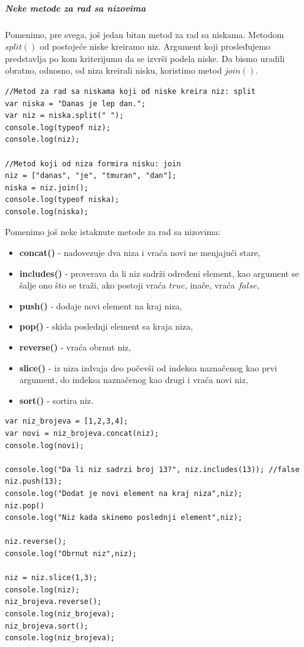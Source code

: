 \documentclass[a4paper]{article}
\begin{document}
\subparagraph{Neke metode za rad sa nizovima}

Pomenimo, pre svega, još jedan bitan metod za rad sa niskama. Metodom $split()$ od postojeće niske kreiramo niz. Argument koji prosleđujemo predstavlja po kom kriterijumu da se izvrši podela niske. Da bismo uradili obratno, odnosno, od niza kreirali nisku, koristimo metod $join()$.
\begin{lstlisting}[backgroundcolor = \color{lightgray}]
//Metod za rad sa niskama koji od niske kreira niz: split 
var niska = "Danas je lep dan.";
var niz = niska.split(" ");
console.log(typeof niz);
console.log(niz);

//Metod koji od niza formira nisku: join
niz = ["danas", "je", "tmuran", "dan"];
niska = niz.join();
console.log(typeof niska);
console.log(niska);
\end{lstlisting}
Pomenimo još neke istaknute metode za rad sa nizovima:  
\begin{itemize}
    \item \textbf{concat()} - nadovezuje dva niza i vraća novi ne menjajući stare,
    \item \textbf{includes()} - proverava da li niz sadrži određeni element, kao argument se šalje  ono što se traži, ako postoji vraća $true$, inače, vraća $false$,  
    \item \textbf{push()} - dodaje novi element na kraj niza, 
    \item \textbf{pop()} - skida poslednji element sa kraja niza, 
    \item \textbf{reverse()} - vraća obrnut niz, 
    \item \textbf{slice()} - iz niza izdvaja deo počevši od indeksa naznačenog kao prvi argument, do indeksa naznačenog kao drugi i vraća novi niz, 
    \item \textbf{sort()} - sortira niz.
\end{itemize}
\begin{lstlisting}[backgroundcolor = \color{lightgray}]
var niz_brojeva = [1,2,3,4];
var novi = niz_brojeva.concat(niz);
console.log(novi);

console.log("Da li niz sadrzi broj 13?", niz.includes(13)); //false
niz.push(13);
console.log("Dodat je novi element na kraj niza",niz);
niz.pop()
console.log("Niz kada skinemo poslednji element",niz);
			
niz.reverse();
console.log("Obrnut niz",niz);

niz = niz.slice(1,3);
console.log(niz);
niz_brojeva.reverse();
console.log(niz_brojeva);
niz_brojeva.sort();
console.log(niz_brojeva);
\end{lstlisting}
\end{document}

